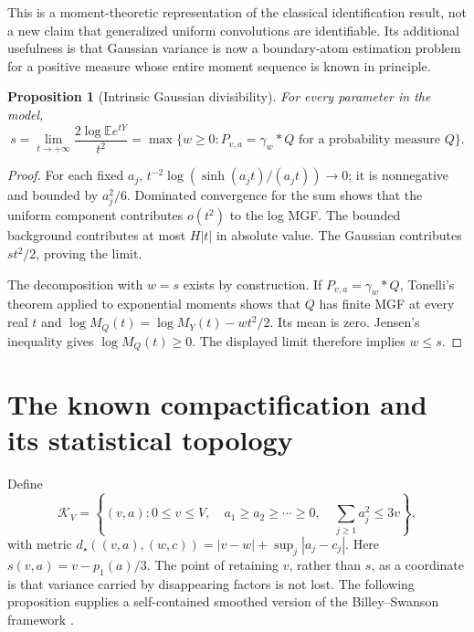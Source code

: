 \documentclass[11pt,letterpaper]{article}
\numberwithin{equation}{section}
\newtheorem{proposition}[theorem]{Proposition}
\theoremstyle{definition}
\theoremstyle{remark}
\newcommand{\E}{\mathbb E}
\newcommand{\K}{\mathcal K_V}
\begin{document}
This is a moment-theoretic representation of the classical identification
result, not a new claim that generalized uniform convolutions are identifiable.
Its additional usefulness is that Gaussian variance is now a boundary-atom
estimation problem for a positive measure whose entire moment sequence is
known in principle.

\begin{proposition}[Intrinsic Gaussian divisibility]
\label{prop:intrinsic}
For every parameter in the model,
\begin{equation}
 s=\lim_{t\to+\infty}\frac{2\log\E e^{tY}}{t^2}
   =\max\{w\ge0:P_{v,a}=\gamma_w*Q\text{ for a probability measure }Q\}.
 \label{eq:intrinsic}
\end{equation}
\end{proposition}
\begin{proof}
For each fixed $a_j$, $t^{-2}\log(\sinh(a_jt)/(a_jt))\to0$; it is
nonnegative and bounded by $a_j^2/6$. Dominated convergence for the sum
shows that the uniform component contributes $o(t^2)$ to the log MGF.
The bounded background contributes at most $H|t|$ in absolute value.
The Gaussian contributes $st^2/2$, proving the limit.

The decomposition with $w=s$ exists by construction. If $P_{v,a}=\gamma_w*Q$,
Tonelli's theorem applied to exponential moments shows that $Q$ has finite
MGF at every real $t$ and
$\log M_Q(t)=\log M_Y(t)-wt^2/2$.
Its mean is zero. Jensen's inequality gives $\log M_Q(t)\ge0$.
The displayed limit therefore implies $w\le s$.
\end{proof}

\section{The known compactification and its statistical topology}
\label{sec:topology}

Define
\begin{equation}
 \K=\left\{(v,a):0\le v\le V,\quad
 a_1\ge a_2\ge\cdots\ge0,\quad\sum_{j\ge1}a_j^2\le3v\right\},
 \label{eq:K}
\end{equation}
with metric
$d_\star((v,a),(w,c))=|v-w|+\sup_j|a_j-c_j|$.
Here $s(v,a)=v-p_1(a)/3$. The point of retaining $v$, rather than $s$, as a
coordinate is that variance carried by disappearing factors is not lost.
The following proposition supplies a self-contained smoothed version of the
Billey--Swanson framework \cite{billey}.
\end{document}

